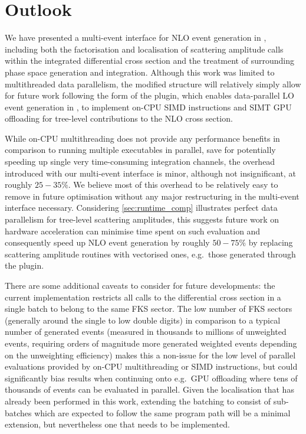 \documentclass[a4paper,11pt]{article}
\begin{document}
\section{Outlook}
\label{sec:outlook}


We have presented a multi-event interface for NLO event generation in \madgraph{}, including both the factorisation and localisation of scattering amplitude calls within the integrated differential cross section and the treatment of surrounding phase space generation and integration. Although this work was limited to multithreaded data parallelism, the modified structure will relatively simply allow for future work following the form of the \cudacpp{} plugin, which enables data-parallel LO event generation in \mg{}, to implement on-CPU SIMD instructions and SIMT GPU offloading for tree-level contributions to the NLO cross section.

While on-CPU multithreading does not provide any performance benefits in comparison to running multiple executables in parallel, save for potentially speeding up single very time-consuming integration channels, the overhead introduced with our multi-event interface is minor, although not insignificant, at roughly $25-35\%$. We believe most of this overhead to be relatively easy to remove in future optimisation without any major restructuring in the multi-event interface necessary. Considering \cref{sec:runtime_comp} illustrates perfect data parallelism for tree-level scattering amplitudes, this suggests future work on hardware acceleration can minimise time spent on such evaluation and consequently speed up NLO event generation by roughly $50-75\%$ by replacing scattering amplitude routines with vectorised ones, e.g.\ those generated through the \cudacpp{} plugin.

There are some additional caveats to consider for future developments: the current implementation restricts all calls to the differential cross section in a single batch to belong to the same FKS sector. The low number of FKS sectors (generally around the single to low double digits) in comparison to a typical number of generated events (measured in thousands to millions of unweighted events, requiring orders of magnitude more generated weighted events depending on the unweighting efficiency) makes this a non-issue for the low level of parallel evaluations provided by on-CPU multithreading or SIMD instructions, but could significantly bias results when continuing onto e.g.\ GPU offloading where tens of thousands of events can be evaluated in parallel. Given the localisation that has already been performed in this work, extending the batching to consist of sub-batches which are expected to follow the same program path will be a minimal extension, but nevertheless one that needs to be implemented.
\end{document}
